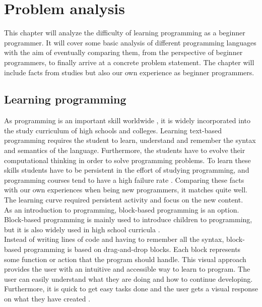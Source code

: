\chapter{Problem analysis}\label{ch:ch2label}


This chapter will analyze the difficulty of learning programming as a beginner programmer. It will cover some basic analysis of different programming languages with the aim of eventually comparing them, from the perspective of beginner programmers, to finally arrive at a concrete problem statement. The chapter will include facts from studies but also our own experience as beginner programmers.

\section{Learning programming }
As programming is an important skill worldwide \cite{ProgrammingImportant}, it is widely incorporated into the study curriculum of high schools and colleges. Learning text-based programming requires the student to learn, understand and remember the syntax and semantics of the language. Furthermore, the students have to evolve their computational thinking in order to solve programming problems. To learn these skills students have to be persistent in the effort of studying programming, and programming courses tend to have a high failure rate \cite{FactorsDifficultiesInProgramming}. Comparing these facts with our own experiences when being new programmers, it matches quite well. The learning curve required persistent activity and focus on the new content. \\

As an introduction to programming, block-based programming is an option. Block-based programming is mainly used to introduce children to programming, but it is also widely used in high school curricula \cite{FromBlockToText}.\\
Instead of writing lines of code and having to remember all the syntax, block-based programming is based on drag-and-drop blocks. Each block represents some function or action that the program should handle. This visual approach provides the user with an intuitive and accessible way to learn to program. The user can easily understand what they are doing and how to continue developing. Furthermore, it is quick to get easy tasks done and the user gets a visual response on what they have created \cite{FunTechBlockBased}.\\

